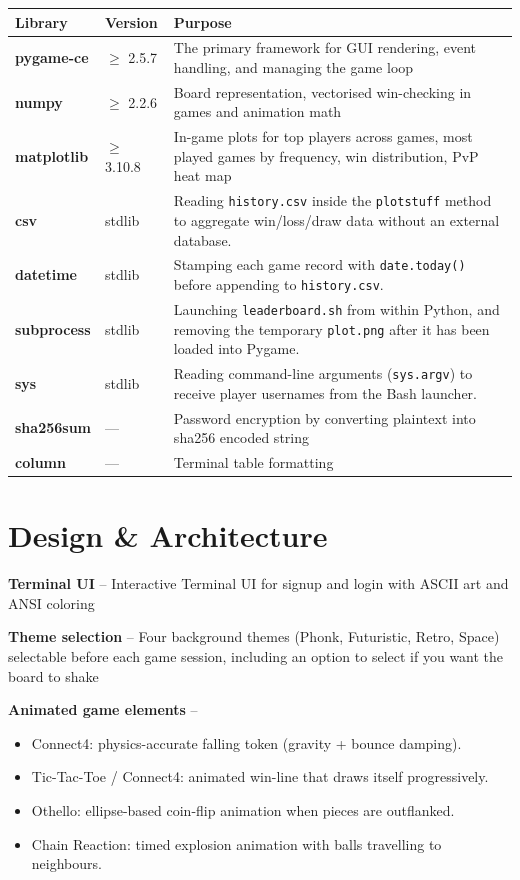 \documentclass[12pt]{article}
\begin{document}
\begin{center}
\begin{tabular}{>{\bfseries}p{3.2cm} p{4cm} p{6.5cm}}
\toprule
Library & Version & Purpose \\
\midrule
pygame-ce & $\geq$ 2.5.7 & The primary framework for GUI rendering, event handling, and managing the game loop \\
numpy & $\geq$ 2.2.6 & Board representation, vectorised win-checking in games and animation math \\
matplotlib & $\geq$ 3.10.8 & In-game plots for top players across games, most played games by frequency, win distribution, PvP heat map \\
csv & stdlib & Reading \texttt{history.csv} inside the \texttt{plotstuff} method to aggregate win/loss/draw data without an external database. \\
datetime & stdlib & Stamping each game record with \texttt{date.today()} before appending to \texttt{history.csv}. \\
subprocess & stdlib & Launching \texttt{leaderboard.sh} from within Python, and removing the temporary \texttt{plot.png} after it has been loaded into Pygame. \\
sys & stdlib & Reading command-line arguments (\texttt{sys.argv}) to receive player usernames from the Bash launcher. \\
sha256sum & --- & Password encryption by converting plaintext into sha256 encoded string\\
column & --- & Terminal table formatting \\
\bottomrule
\end{tabular}
\end{center}

\section{Design \& Architecture}

\textbf{Terminal UI} -- Interactive Terminal UI for signup and login with ASCII art and ANSI coloring

\textbf{Theme selection} -- Four background themes (Phonk, Futuristic, Retro, Space) selectable before each game session, including an option to select if you want the board to shake

\textbf{Animated game elements} --
  \begin{itemize}[noitemsep]
    \item Connect4: physics-accurate falling token (gravity + bounce damping).
    \item Tic-Tac-Toe / Connect4: animated win-line that draws itself progressively.
    \item Othello: ellipse-based coin-flip animation when pieces are outflanked.
    \item Chain Reaction: timed explosion animation with balls travelling to neighbours.
  \end{itemize}
\end{document}
